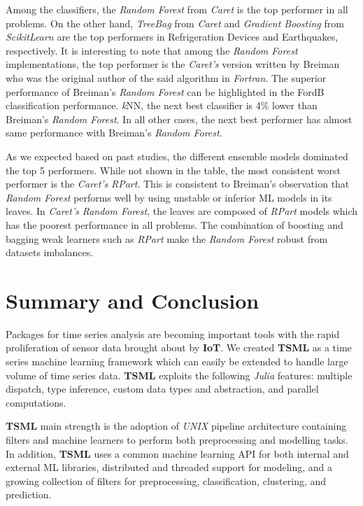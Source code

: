 \documentclass{juliacon}
\begin{document}
\vskip 6pt

Among the classifiers, the \emph{Random Forest} from \emph{Caret} is the top performer in all problems. On the other hand, \emph{TreeBag} from \emph{Caret} and \emph{Gradient Boosting} from \emph{ScikitLearn} are the top performers in Refrigeration Devices and Earthquakes, respectively. It is interesting to note that among the \emph{Random Forest} implementations, the top performer is the \emph{Caret's} version written by Breiman\cite{Breiman2001} who was the original author of the said algorithm in \emph{Fortran}. The superior performance of Breiman's \emph{Random Forest} can be highlighted in the FordB classification performance.  \emph{k}NN, the next best classifier is 4\% lower than Breiman's \emph{Random Forest}. In all other cases, the next best performer has almost same performance with  Breiman's \emph{Random Forest}.
 
\vskip 6pt
 
As we expected based on past studies, the different ensemble models dominated the top 5 performers. While not shown in the table, the most consistent worst performer is the \emph{Caret's} \emph{RPart}. This is consistent to Breiman's observation that \emph{Random Forest} performs well by using unstable or inferior ML models in its leaves. In \emph{Caret's} \emph{Random Forest}, the leaves are composed of \emph{RPart} models which has the poorest performance in all problems. The combination of boosting and bagging weak learners such as \emph{RPart} make the \emph{Random Forest} robust from datasets imbalances. 
 
\section{Summary and Conclusion}
Packages for time series analysis are becoming important tools with the rapid proliferation of sensor data brought about by \textbf{IoT}.  We created \textbf{TSML} as a time series machine learning framework which can easily be extended to handle large volume of time series data. 
\textbf{TSML}  exploits the following \emph{Julia} features: multiple dispatch, type inference, custom data types and abstraction, and parallel computations. 

\vskip 6pt

\textbf{TSML} main strength is the adoption of \emph{UNIX} pipeline architecture containing filters and machine learners to perform both preprocessing and modelling tasks.  In addition, \textbf{TSML} uses a common machine learning API for both internal and external ML libraries, distributed and threaded support for modeling, and a growing collection of filters for preprocessing, classification, clustering, and prediction. 
\end{document}
